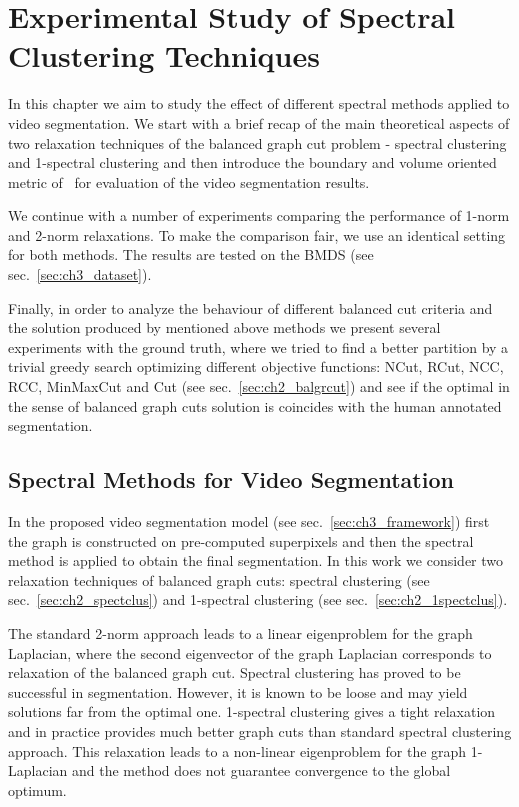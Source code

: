 \chapter{Experimental Study of Spectral Clustering Techniques}
\label{Chapter4}

In this chapter we aim to study the effect of different spectral methods applied to video segmentation. 
We start with a brief recap of the main theoretical aspects of two relaxation techniques of the balanced graph cut problem - spectral clustering and 1-spectral clustering 
and then introduce the boundary and volume oriented metric of~\cite{Galasso13} for evaluation of the video segmentation results.

We continue with a number of experiments comparing the performance of 1-norm and 2-norm relaxations.
To make the comparison fair, we use an identical setting for both methods. The results are tested on the BMDS (see sec.~\ref{sec:ch3_dataset}). 

Finally, in order to analyze the behaviour of different balanced cut criteria and the solution produced by mentioned above methods we present several experiments with the ground truth, where we tried to find a better partition by 
a trivial greedy search optimizing different objective functions: NCut, RCut, NCC, RCC, MinMaxCut and Cut (see sec.~\ref{sec:ch2_balgrcut}) and see if the optimal in the sense of balanced graph cuts solution is coincides with the 
human annotated segmentation.  
\section{Spectral Methods for Video Segmentation}
\label{ch4:recap}
In the proposed video segmentation model (see sec.~\ref{sec:ch3_framework}) first the graph is constructed on pre-computed superpixels and then the spectral method is applied to obtain the final segmentation. 
In this work we consider two relaxation techniques of balanced graph cuts: spectral clustering (see sec.~\ref{sec:ch2_spectclus}) 
and 1-spectral clustering (see sec.~\ref{sec:ch2_1spectclus}).

The standard 2-norm approach leads to a linear eigenproblem for the graph Laplacian, where the second eigenvector of the graph Laplacian corresponds to relaxation of the balanced graph cut.
Spectral clustering has proved to be successful in segmentation. However, it is known to be loose and may yield solutions far from the optimal one.
1-spectral clustering gives a tight relaxation and in practice provides much better graph cuts than standard spectral clustering approach.
This relaxation leads to a non-linear eigenproblem for the graph 1-Laplacian and the method does not guarantee convergence to the global optimum.

